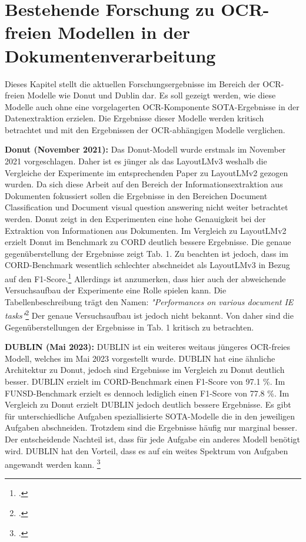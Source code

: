 \section{Bestehende Forschung zu OCR-freien Modellen in der Dokumentenverarbeitung}
Dieses Kapitel stellt die aktuellen Forschungsergebnisse im Bereich der OCR-freien Modelle wie Donut und Dublin dar. Es soll gezeigt werden, wie diese Modelle auch ohne eine vorgelagerten OCR-Komponente \ac{SOTA}-Ergebnisse in der Datenextraktion erzielen. Die Ergebnisse dieser Modelle werden kritisch betrachtet und mit den Ergebnissen der OCR-abhängigen Modelle verglichen.

\textbf{Donut (November 2021):} Das Donut-Modell wurde erstmals im November 2021 vorgeschlagen. Daher ist es jünger als das LayoutLMv3 weshalb die Vergleiche der Experimente im entsprechenden Paper zu LayoutLMv2 gezogen wurden. Da sich diese Arbeit auf den Bereich der Informationsextraktion aus Dokumenten fokussiert sollen die Ergebnisse in den Bereichen Document Classification und Document visual question answering nicht weiter betrachtet werden. Donut zeigt in den Experimenten eine hohe Genauigkeit bei der Extraktion von Informationen aus Dokumenten. Im Vergleich zu LayoutLMv2 erzielt Donut im Benchmark zu \ac{CORD} deutlich bessere Ergebnisse. Die genaue gegenüberstellung der Ergebnisse zeigt Tab. 1. Zu beachten ist jedoch, dass im \ac{CORD}-Benchmark wesentlich schlechter abschneidet als LayoutLMv3 in Bezug auf den F1-Score.\footcites[Vgl.][S. 10]{kim_ocr-free_2021} Allerdings ist anzumerken, dass hier auch der abweichende Versuchsaufbau der Experimente eine Rolle spielen kann. Die Tabellenbeschreibung trägt den Namen: \emph{"Performances on various document IE tasks"}\footcites[][S. 10]{kim_ocr-free_2021} Der genaue Versuchsaufbau ist jedoch nicht bekannt. Von daher sind die Gegenüberstellungen der Ergebnisse in Tab. 1 kritisch zu betrachten.

\textbf{DUBLIN (Mai 2023):} \ac{DUBLIN} ist ein weiteres weitaus jüngeres OCR-freies Modell, welches im Mai 2023 vorgestellt wurde. DUBLIN hat eine ähnliche Architektur zu Donut, jedoch sind Ergebnisse im Vergleich zu Donut deutlich besser. DUBLIN erzielt im \ac{CORD}-Benchmark einen F1-Score von 97.1 \%. Im \ac{FUNSD}-Benchmark erzielt es dennoch lediglich einen F1-Score von 77.8 \%. Im Vergleich zu Donut erzielt \ac{DUBLIN} jedoch deutlich bessere Ergebnisse. Es gibt für unterschiedliche Aufgaben speziallisierte \ac{SOTA}-Modelle die in den jeweiligen Aufgaben abschneiden. Trotzdem sind die Ergebnisse häufig nur marginal besser. Der entscheidende Nachteil ist, dass für jede Aufgabe ein anderes Modell benötigt wird. \ac{DUBLIN} hat den Vorteil, dass es auf ein weites Spektrum von Aufgaben angewandt werden kann. \footcites[Vgl. dazu ausführlich][S. 698]{aggarwal_dublin_2023}

